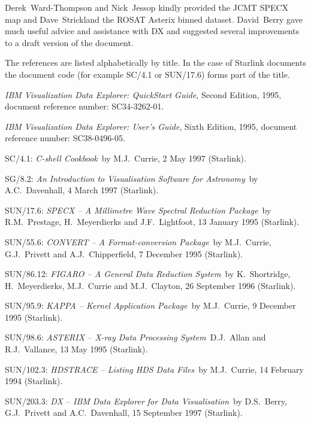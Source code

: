 \documentclass[twoside,11pt]{article}
\newcommand{\xref}[3]{#1}
\begin{document}
Derek~Ward-Thompson and Nick~Jessop kindly provided the JCMT SPECX map and
Dave~Strickland the ROSAT Asterix binned dataset.  David~Berry gave much
useful advice and assistance with DX and suggested several improvements to
a draft version of the document.


\begin{thebibliography}{99}

  \item[~] The references are listed alphabetically by title.  In the
   case of Starlink documents the document code (for example SC/4.1
   or SUN/17.6) forms part of the title.

   {\it IBM Visualization Data Explorer: QuickStart
   Guide}, Second Edition, 1995, document reference number:
   SC34-3262-01.

   {\it IBM Visualization Data Explorer: User's Guide},
   Sixth Edition, 1995, document reference number: SC38-0496-05.

   \xref{SC/4.1}{sc4}{}:
   {\it C-shell Cookbook}\, by M.J.~Currie, 2 May 1997 (Starlink).

   \xref{SG/8.2}{sg8}{}:
   {\it An Introduction to Visualisation Software for Astronomy}\,
   by A.C.~Davenhall, 4 March 1997 (Starlink).

   \xref{SUN/17.6}{sun17}{}:
   {\it SPECX -- A Millimetre Wave Spectral Reduction Package}\, by
   R.M.~Prestage, H.~Meyerdierks and    J.F.~Lightfoot, 13 January 1995
   (Starlink).

   \xref{SUN/55.6}{sun55}{}:
   {\it CONVERT -- A Format-conversion Package}\, by M.J.~Currie,
   G.J.~Privett and A.J.~Chipperfield, 7 December 1995 (Starlink).

   \xref{SUN/86.12}{sun86}{}:
   {\it FIGARO -- A General Data Reduction System}\, by K.~Shortridge,
   H.~Meyerdierks, M.J.~Currie and M.J.~Clayton, 26 September 1996
   (Starlink).

   \xref{SUN/95.9}{sun95}{}:
   {\it KAPPA -- Kernel Application Package}\, by M.J.~Currie,
   9 December 1995 (Starlink).

   \xref{SUN/98.6}{sun98}{}:
   {\it ASTERIX -- X-ray Data Processing System}\,
   D.J.~Allan and R.J.~Vallance, 13 May 1995 (Starlink).

   \xref{SUN/102.3}{sun102}{}:
   {\it HDSTRACE -- Listing HDS Data Files}\, by M.J.~Currie,
   14 February 1994 (Starlink).

   \xref{SUN/203.3}{sun203}{}:
   {\it DX -- IBM Data Explorer for Data Visualisation}\, by D.S.~Berry,
   G.J.~Privett and A.C.~Davenhall, 15 September 1997 (Starlink).

\end{thebibliography}


\typeout{  }
\typeout{*****************************************************}
\typeout{  }
\typeout{  }
\typeout{*****************************************************}
\typeout{  }
\end{document}

